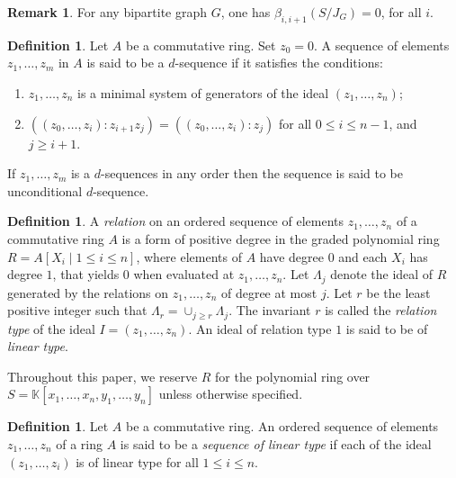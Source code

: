 \documentclass[11pt,a4paper,reqno]{amsart}
\theoremstyle{definition}
\newtheorem{definition}[theorem]{Definition}
\newtheorem{remark}[theorem]{Remark}
\begin{document}
\begin{remark} \cite[Corollary 2.5]{SK} \label{rem.syz}
    For any bipartite graph $G$, one has $\beta_{i,i+1}(S/J_G) = 0$, for all $i$.
\end{remark}



\begin{definition}\cite[Definition 1.1]{H1982} \label{Def-d-sequence} Let $A$ be a commutative ring. Set $z_0 = 0$. A sequence of elements $z_1,\ldots,z_m$ in $A$ is said to be a $d$-sequence if it satisfies the conditions: 
\begin{enumerate}
    \item $z_1,\ldots,z_n$ is a minimal system of generators of the ideal $(z_1,\ldots,z_n)$;
    \item $( ( z_0,\ldots,z_i ) : z_{i+1}z_j) = (( z_0,\ldots,z_i ) : z_j)$ for all $0 \leq i \leq n-1$, and $j \geq i+1$.
\end{enumerate} 
     If $z_1,\ldots,z_m$ is a $d$-sequences in any order then the sequence is said to be  unconditional $d$-sequence.
\end{definition}


\begin{definition} \cite[Definition 1.1]{R1994} \label{def.relation}
    A \textit{relation} on an ordered sequence of elements $z_1,\ldots, z_n$ of a commutative ring $A$ is a form of positive degree in the graded polynomial ring $R=A[X_i \mid 1 \leq i \leq n]$, where elements of $A$ have degree $0$ and each $X_i$ has degree $1$, that yields $0$ when evaluated at $z_1,\ldots, z_n$. Let $\Lambda_j$ denote the ideal of $R$ generated by the relations on $z_1,\ldots, z_n$ of degree at most $j$. Let $r$ be the least positive integer such that $\Lambda_r =\cup_{j\geq r} \Lambda_j$. The invariant $r$ is called the \textit{relation type} of the ideal $I=(z_1,\ldots, z_n)$. An ideal of relation type $1$ is said to be of \textit{linear type}.
\end{definition}

Throughout this paper, we reserve $R$ for the polynomial ring over $S=\mathbb{K}[x_1,\ldots,x_n,y_1,\ldots,y_n]$ unless otherwise specified.

\begin{definition} \cite[p. 257]{C1985}
    Let $A$ be a commutative ring. An ordered sequence of elements $z_1,\ldots, z_n$ of a ring $A$ is said to be a \textit{sequence of linear type} if each of the ideal $(z_1,\ldots, z_i)$ is of linear type for all $1\leq i \leq n$.
\end{definition}
\end{document}
